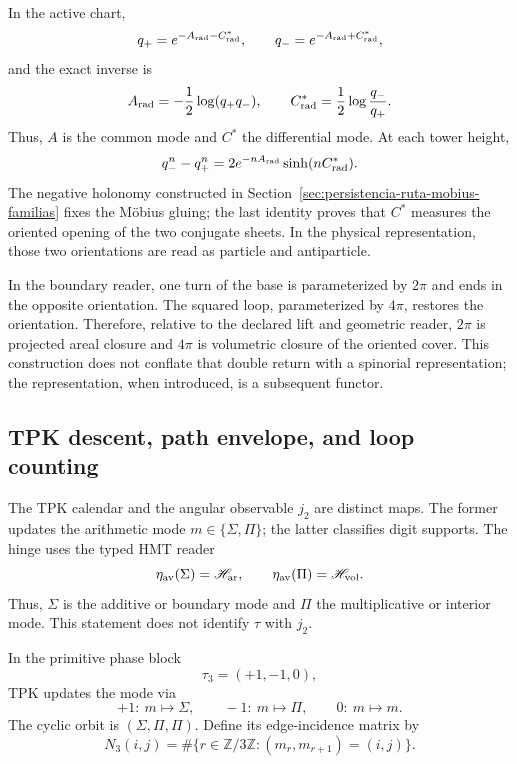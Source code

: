 In the active chart,
\[
 q_+=e^{-A_{\rm rad}-C^*_{\rm rad}},\qquad
 q_-=e^{-A_{\rm rad}+C^*_{\rm rad}},
\]
and the exact inverse is
\[
 A_{\rm rad}=-\frac12\log(q_+q_-),
 \qquad
 C^*_{\rm rad}=\frac12\log\frac{q_-}{q_+}.
\]
Thus, \(A\) is the common mode and \(C^*\) the differential mode. At each
tower height,
\[
 q_-^n-q_+^n
 =2e^{-nA_{\rm rad}}\sinh(nC^*_{\rm rad}).
\]
The negative holonomy constructed in
Section~\ref{sec:persistencia-ruta-mobius-familias} fixes the Möbius
gluing; the last identity proves that \(C^*\) measures the oriented opening
of the two conjugate sheets. In the physical representation, those two
orientations are read as particle and antiparticle.

In the boundary reader, one turn of the base is parameterized by \(2\pi\) and
ends in the opposite orientation. The squared loop, parameterized by
\(4\pi\), restores the orientation. Therefore, relative to the declared lift and
geometric reader, \(2\pi\) is projected areal closure and
\(4\pi\) is volumetric closure of the oriented cover. This construction does not
conflate that double return with a spinorial representation; the
representation, when introduced, is a subsequent functor.

\subsection{TPK descent, path envelope, and loop counting}

The TPK calendar and the angular observable \(j_2\) are distinct maps.
The former updates the arithmetic mode \(m\in\{\Sigma,\Pi\}\); the latter classifies
digit supports. The hinge uses the typed HMT reader
\[
 \eta_{\rm av}(\Sigma)=\mathscr H_{\rm ar},
 \qquad
 \eta_{\rm av}(\Pi)=\mathscr H_{\rm vol}.
\]
Thus, \(\Sigma\) is the additive or boundary mode and \(\Pi\) the
multiplicative or interior mode. This statement does not identify
\(\tau\) with \(j_2\).

In the primitive phase block
\[
 \tau_3=(+1,-1,0),
\]
TPK updates the mode via
\[
 +1:\ m\mapsto\Sigma,\qquad
 -1:\ m\mapsto\Pi,\qquad
 0:\ m\mapsto m.
\]
The cyclic orbit is \((\Sigma,\Pi,\Pi)\). Define its edge-incidence
matrix by
\[
 N_3(i,j)=
 \#\{r\in\mathbb Z/3\mathbb Z:(m_r,m_{r+1})=(i,j)\}.
\]


